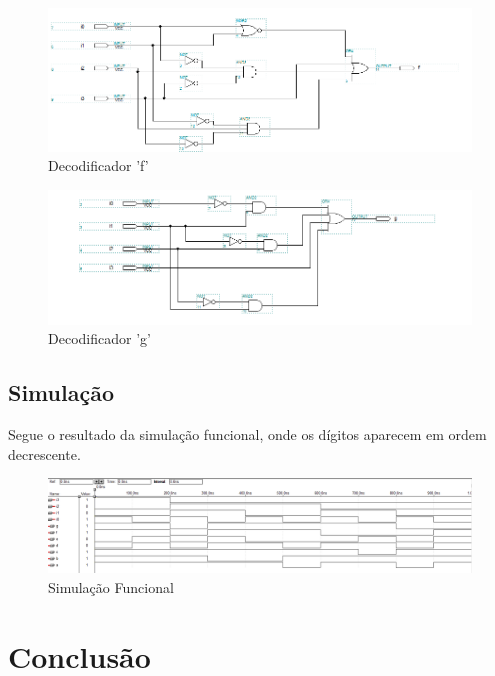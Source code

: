 \documentclass[a4paper]{article}
\begin{document}
\begin{figure}[h!]
  \centering
  \includegraphics[scale=0.7]{dec_f.png}
  \caption{Decodificador 'f'}
\end{figure}

\begin{figure}[h!]
  \centering
  \includegraphics[scale=0.7]{dec_g.png}
  \caption{Decodificador 'g'}
\end{figure}

\FloatBarrier
\subsection{Simulação}

Segue o resultado da simulação funcional, onde os dígitos aparecem em ordem decrescente.

\begin{figure}[h!]
  \centering
  \includegraphics[scale=0.4]{simulacao.png}
  \caption{Simulação Funcional}
\end{figure}


\FloatBarrier

\section{Conclusão}
\end{document}
